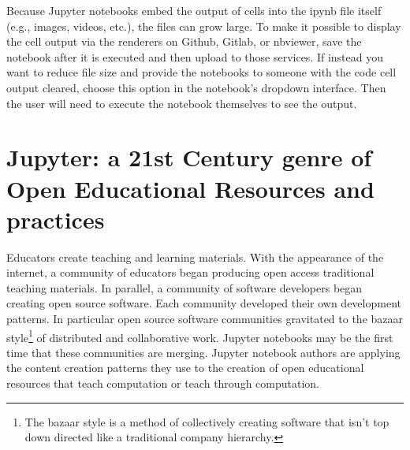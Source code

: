 \documentclass[]{book}
\let\rmarkdownfootnote\footnote%
\def\footnote{\protect\rmarkdownfootnote}
\begin{document}
Because Jupyter notebooks embed the output of cells into the ipynb
file itself (e.g., images, videos, etc.), the files can grow large. To
make it possible to display the cell output via the renderers on
Github, Gitlab, or nbviewer, save the notebook after it is executed
and then upload to those services. If instead you want to reduce file
size and provide the notebooks to someone with the code cell output
cleared, choose this option in the notebook's dropdown interface. Then
the user will need to execute the notebook themselves to see the
output.

\hypertarget{jupyter-a-21st-century-genre-of-open-educational-resources-and-practices}{%
\section{Jupyter: a 21st Century genre of Open Educational Resources and practices}\label{jupyter-a-21st-century-genre-of-open-educational-resources-and-practices}}

Educators create teaching and learning materials. With the appearance
of the internet, a community of educators began producing open access
traditional teaching materials. In parallel, a community of software
developers began creating open source software. Each community
developed their own development patterns. In particular open source
software communities gravitated to the bazaar style\footnote{The bazaar style is a method of collectively creating software
  that isn't top down directed like a traditional company
  hierarchy.} of distributed
and collaborative work. Jupyter notebooks may be the first time that
these communities are merging. Jupyter notebook authors are applying
the content creation patterns they use to the creation of open
educational resources that teach computation or teach through
computation.
\end{document}
